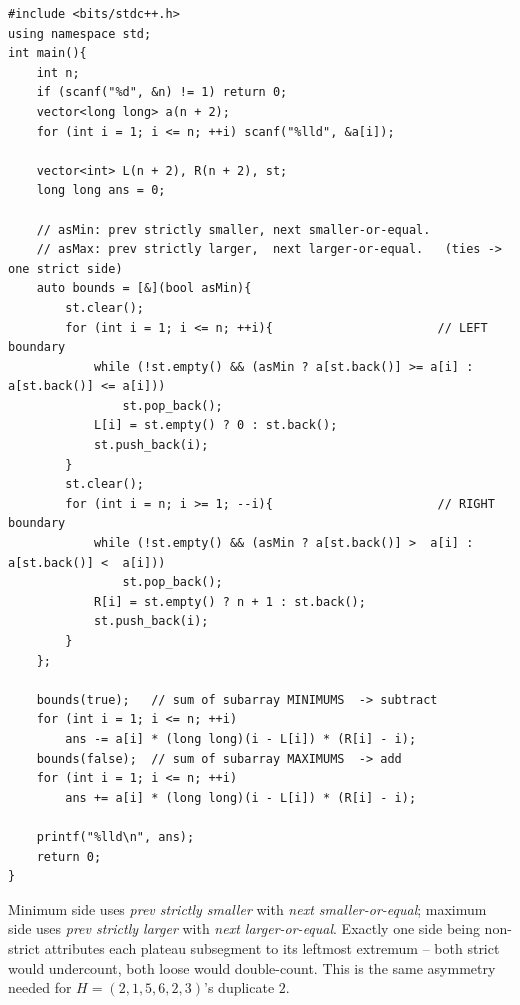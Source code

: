 \begin{lstlisting}[caption={Imbalanced Array -- signed span contribution, four monotonic sweeps (Codeforces 817D; O(n) time, long long)}, label={lst:c26-summit}]
#include <bits/stdc++.h>
using namespace std;
int main(){
    int n;
    if (scanf("%d", &n) != 1) return 0;
    vector<long long> a(n + 2);
    for (int i = 1; i <= n; ++i) scanf("%lld", &a[i]);

    vector<int> L(n + 2), R(n + 2), st;
    long long ans = 0;

    // asMin: prev strictly smaller, next smaller-or-equal.
    // asMax: prev strictly larger,  next larger-or-equal.   (ties -> one strict side)
    auto bounds = [&](bool asMin){
        st.clear();
        for (int i = 1; i <= n; ++i){                       // LEFT boundary
            while (!st.empty() && (asMin ? a[st.back()] >= a[i] : a[st.back()] <= a[i]))
                st.pop_back();
            L[i] = st.empty() ? 0 : st.back();
            st.push_back(i);
        }
        st.clear();
        for (int i = n; i >= 1; --i){                       // RIGHT boundary
            while (!st.empty() && (asMin ? a[st.back()] >  a[i] : a[st.back()] <  a[i]))
                st.pop_back();
            R[i] = st.empty() ? n + 1 : st.back();
            st.push_back(i);
        }
    };

    bounds(true);   // sum of subarray MINIMUMS  -> subtract
    for (int i = 1; i <= n; ++i)
        ans -= a[i] * (long long)(i - L[i]) * (R[i] - i);
    bounds(false);  // sum of subarray MAXIMUMS  -> add
    for (int i = 1; i <= n; ++i)
        ans += a[i] * (long long)(i - L[i]) * (R[i] - i);

    printf("%lld\n", ans);
    return 0;
}
\end{lstlisting}
\begin{notebox}
Minimum side uses \emph{prev strictly smaller} with \emph{next smaller-or-equal}; maximum side uses
\emph{prev strictly larger} with \emph{next larger-or-equal}. Exactly one side being non-strict attributes
each plateau subsegment to its leftmost extremum -- both strict would undercount, both loose would
double-count. This is the same asymmetry  needed for $H=(2,1,5,6,2,3)$'s duplicate $2$.
\end{notebox}

